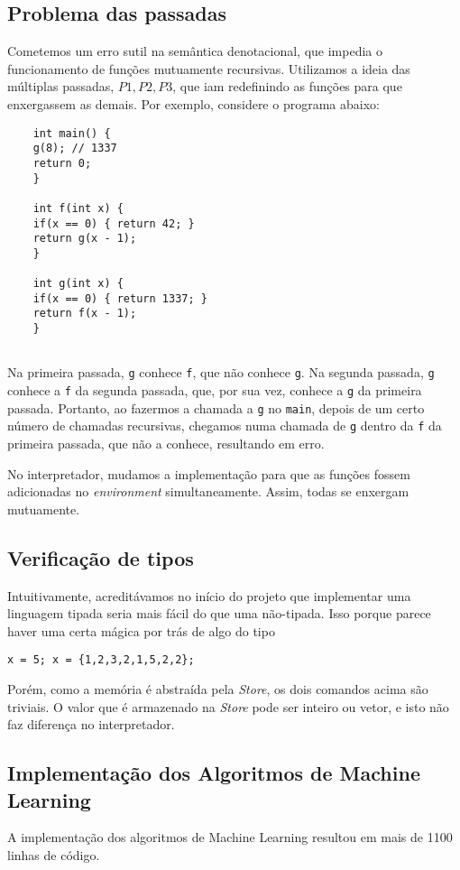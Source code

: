 \documentclass[12pt]{article}
\begin{document}
\subsection{Problema das passadas}
	 Cometemos um erro sutil na semântica denotacional, que impedia o funcionamento de funções mutuamente recursivas. Utilizamos a ideia das múltiplas passadas, $P1, P2, P3$, que iam redefinindo as funções para que enxergassem as demais. Por exemplo, considere o programa abaixo:
	
	\begin{verbatim}
	int main() {
	g(8); // 1337
	return 0;
	}
	
	int f(int x) {
	if(x == 0) { return 42; }
	return g(x - 1);
	}
	
	int g(int x) {
	if(x == 0) { return 1337; }
	return f(x - 1);
	}
	
	\end{verbatim}
	
	Na primeira passada, \texttt{g} conhece \texttt{f}, que não conhece \texttt{g}.
	Na segunda passada, \texttt{g} conhece a \texttt{f} da segunda passada, que, por sua vez, conhece a \texttt{g} da primeira passada. Portanto, ao fazermos a chamada a \texttt{g} no \texttt{main}, depois de um certo número de chamadas recursivas, chegamos numa chamada de \texttt{g} dentro da \texttt{f} da primeira passada, que não a conhece, resultando em erro.
	
	No interpretador, mudamos a implementação para que as funções fossem adicionadas no \textit{environment} simultaneamente. Assim, todas se enxergam mutuamente.
	
\subsection{Verificação de tipos}
Intuitivamente, acreditávamos no início do projeto que implementar uma linguagem tipada seria mais fácil do que uma não-tipada. Isso porque parece haver uma certa mágica por trás de algo do tipo
\begin{Verbatim}
x = 5; x = {1,2,3,2,1,5,2,2};
\end{Verbatim}

Porém, como a memória é abstraída pela \textit{Store}, os dois comandos acima são triviais. O valor que é armazenado na \textit{Store} pode ser inteiro ou vetor, e isto não faz diferença no interpretador.

\subsection{Implementação dos Algoritmos de Machine Learning}
A implementação dos algoritmos de Machine Learning resultou em mais de 1100 linhas de código.
\end{document}
